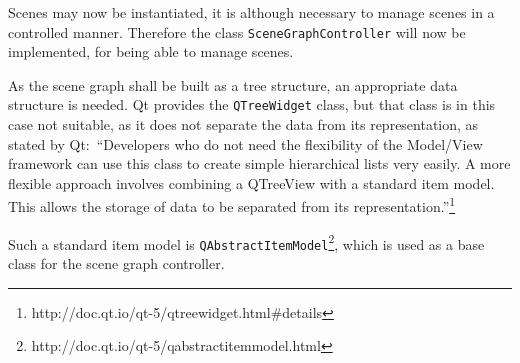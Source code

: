 \documentclass[
    a4paper,      %
    10pt,         %
    openright,    %
    notitlepage,  %
    parskip=half, %
]{scrreprt}       %
\theoremstyle{definition}                    %
\begin{document}
\begin{flushleft}
\begin{minipage}{\linewidth}
\begin{list}{}{\setlength{\itemsep}{-\parsep}\setlength{\itemindent}{-\leftmargin}}
\item{}
\end{list}
\end{minipage}\vspace{4ex}
\end{flushleft}
Scenes may now be instantiated, it is although necessary to manage scenes in a
controlled manner. Therefore the class \verb+SceneGraphController+ will now be
implemented, for being able to manage scenes.

As the scene graph shall be built as a tree structure, an appropriate data
structure is needed. Qt provides the \verb+QTreeWidget+ class, but that
class is in this case not suitable, as it does not separate the data from its
representation, as stated by Qt:~\enquote{Developers who do not need the flexibility of
the Model/View framework can use this class to create simple hierarchical lists
very easily. A more flexible approach involves combining a QTreeView with a
standard item model. This allows the storage of data to be separated from its
representation.}\footnote{http://doc.qt.io/qt-5/qtreewidget.html\#details}

Such a standard item model is
\verb+QAbstractItemModel+\footnote{\label{footnote:qabstractitemmodel}
http://doc.qt.io/qt-5/qabstractitemmodel.html}, which is used as a base class
for the scene graph controller.
\end{document}
